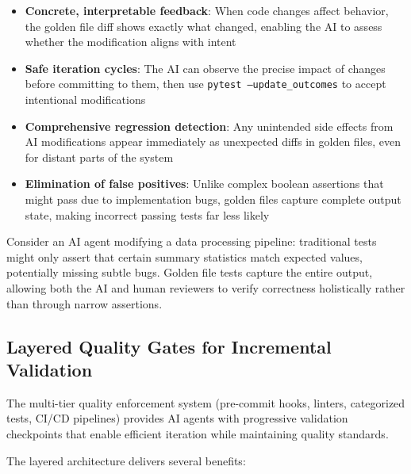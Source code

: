 \begin{itemize}
  \item \textbf{Concrete, interpretable feedback}: When code changes
    affect behavior, the golden file diff shows exactly what changed,
    enabling the AI to assess whether the modification aligns with
    intent

  \item \textbf{Safe iteration cycles}: The AI can observe the precise
    impact of changes before committing to them, then use
    \texttt{pytest --update\_outcomes} to accept intentional modifications

  \item \textbf{Comprehensive regression detection}: Any unintended
    side effects from AI modifications appear immediately as unexpected
    diffs in golden files, even for distant parts of the system

  \item \textbf{Elimination of false positives}: Unlike complex boolean
    assertions that might pass due to implementation bugs, golden files
    capture complete output state, making incorrect passing tests far
    less likely
\end{itemize}

Consider an AI agent modifying a data processing pipeline: traditional
tests might only assert that certain summary statistics match expected
values, potentially missing subtle bugs. Golden file tests capture the
entire output, allowing both the AI and human reviewers to verify correctness
holistically rather than through narrow assertions.

\subsection{Layered Quality Gates for Incremental Validation}

The multi-tier quality enforcement system (pre-commit hooks, linters,
categorized tests, CI/CD pipelines) provides AI agents with progressive
validation checkpoints that enable efficient iteration while maintaining
quality standards.

The layered architecture delivers several benefits:

